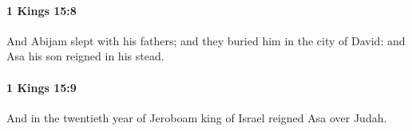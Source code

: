 		\paragraph{1 Kings 15:8} %
			\label{1KINGS-15-8}

			And Abijam slept with his fathers; and they buried him in the city of David: and Asa his son reigned in his stead.


		\paragraph{1 Kings 15:9} %
			\label{1KINGS-15-9}

			And in the twentieth year of Jeroboam king of Israel reigned Asa over Judah.


